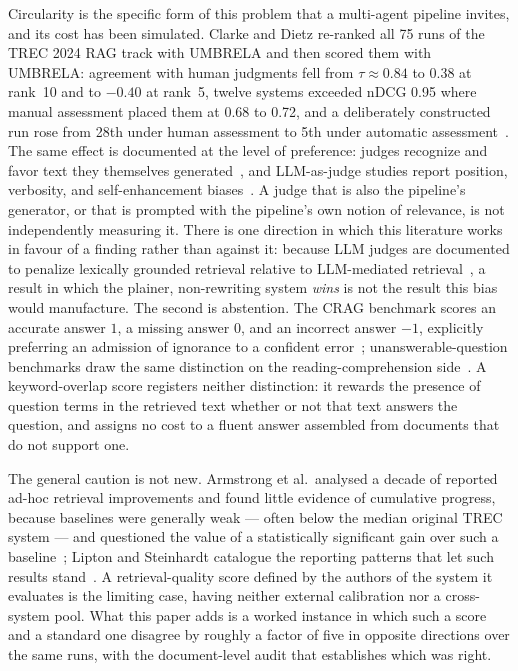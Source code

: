 \documentclass[acmsmall,anonymous,screen]{acmart}
\begin{document}
Circularity is the specific form of this problem that a multi-agent pipeline
invites, and its cost has been simulated. Clarke and Dietz re-ranked all 75 runs
of the TREC 2024 RAG track with UMBRELA and then scored them with UMBRELA:
agreement with human judgments fell from $\tau \approx 0.84$ to 0.38 at rank~10
and to $-0.40$ at rank~5, twelve systems exceeded nDCG 0.95 where manual
assessment placed them at 0.68 to 0.72, and a deliberately constructed run rose
from 28th under human assessment to 5th under automatic
assessment~\cite{clarke2024cannot}. The same effect is documented at the level
of preference: judges recognize and favor text they themselves
generated~\cite{panickssery2024self}, and LLM-as-judge studies report position,
verbosity, and self-enhancement biases~\cite{zheng2023judge}. A judge that is
also the pipeline's generator, or that is prompted with the pipeline's own
notion of relevance, is not independently measuring it. There is one direction
in which this literature works in favour of a finding rather than against it:
because LLM judges are documented to penalize lexically grounded retrieval
relative to LLM-mediated retrieval~\cite{faggioli2023perspectives}, a result in
which the plainer, non-rewriting system \emph{wins} is not the result this bias
would manufacture. The second
is abstention. The CRAG benchmark scores an accurate answer $1$, a missing answer
$0$, and an incorrect answer $-1$, explicitly preferring an admission of
ignorance to a confident
error~\cite{yang2024}; unanswerable-question benchmarks draw the same
distinction on the reading-comprehension side~\cite{rajpurkar2018squad2}. A
keyword-overlap score registers neither distinction: it rewards the presence of
question terms in the retrieved text whether or not that text answers the
question, and assigns no cost to a fluent answer assembled from documents that do
not support one.

The general caution is not new. Armstrong et al.\ analysed a decade of reported
ad-hoc retrieval improvements and found little evidence of cumulative progress,
because baselines were generally weak --- often below the median original TREC
system --- and questioned the value of a statistically significant gain over such
a baseline~\cite{armstrong2009improvements}; Lipton and Steinhardt catalogue the
reporting patterns that let such results stand~\cite{lipton2019trends}. A
retrieval-quality score defined by the authors of the system it evaluates is the
limiting case, having neither external calibration nor a cross-system pool. What
this paper adds is a worked instance in which such a score and a standard one
disagree by roughly a factor of five in opposite directions over the same runs,
with the document-level audit that establishes which was right.
\end{document}
